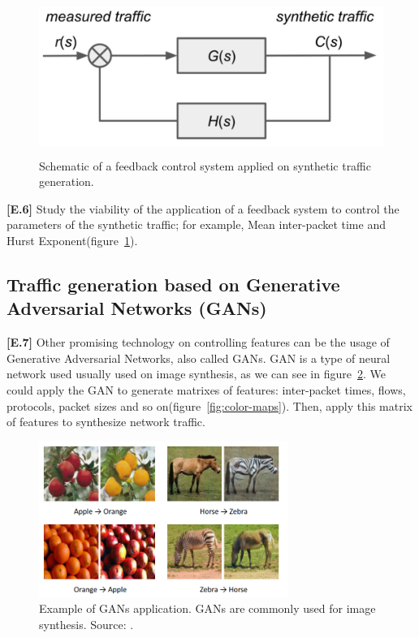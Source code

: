 \begin{figure}[!ht]
    \centering
    \includegraphics[height=2.0in]{figures/ch6/control-system}
    \caption{Schematic of a feedback control system applied on synthetic traffic generation.}
    \label{fig:control-system}
\end{figure}

\textbf{[E.6]} Study the viability of the application of a feedback system to control the parameters of the synthetic traffic; for example, Mean inter-packet time and Hurst Exponent(figure~\ref{fig:control-system}).

\subsection{Traffic generation based on Generative Adversarial Networks (GANs)}

\textbf{[E.7]} Other promising technology on controlling features can be the usage of Generative Adversarial Networks, also called \acrshort{GAN}s\cite{gans-paper}. GAN is a type of neural network used usually used on image synthesis, as we can see in figure~\ref{fig:gans-example}. We could apply the GAN to generate matrixes of features: inter-packet times, flows, protocols, packet sizes and so on(figure~\ref{fig:color-maps}). Then, apply this matrix of features to synthesize network traffic. 

\begin{figure}[!ht]
    \centering
    \includegraphics[height=2.0in]{figures/ch6/gans-example}
    \caption{Example of GANs application. GANs are commonly used for image synthesis. Source: \cite{gans-survey}. }
    \label{fig:gans-example}
\end{figure}

